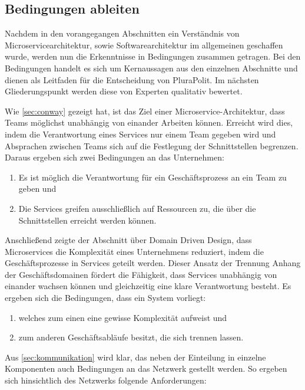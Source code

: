 \subsection{Bedingungen ableiten}
\label{sec:bedingungen}

Nachdem in den vorangegangen Abschnitten ein Verständnis von Microservicearchitektur, sowie Softwarearchitektur im allgemeinen geschaffen wurde, werden nun die Erkenntnisse in Bedingungen zusammen getragen. Bei den Bedingungen handelt es sich um Kernaussagen aus den einzelnen Abschnitte und dienen als Leitfaden für die Entscheidung von PluraPolit. Im nächsten Gliederungspunkt werden diese von Experten qualitativ bewertet.

Wie \cref{sec:conway} gezeigt hat, ist das Ziel einer Microservice-Architektur,  dass Teams möglichst unabhängig von einander Arbeiten können. Erreicht wird dies, indem die Verantwortung eines Services nur einem Team gegeben wird und Absprachen zwischen Teams sich auf die Festlegung der Schnittstellen begrenzen. Daraus ergeben sich zwei Bedingungen an das Unternehmen:

\begin{enumerate}
	\item Es ist möglich die Verantwortung für ein Geschäftsprozess an ein Team zu geben und
	\item Die Services greifen ausschließlich auf Ressourcen zu, die über die Schnittstellen erreicht werden können.
\end{enumerate}

Anschließend zeigte der Abschnitt über Domain Driven Design, dass Microservices die Komplexität eines Unternehmens reduziert, indem die Geschäftsprozesse in Services geteilt werden. Dieser Ansatz der Trennung Anhang der Geschäftsdomainen fördert die Fähigkeit, dass Services unabhängig von einander wachsen können und gleichzeitig eine klare Verantwortung besteht. Es ergeben sich die Bedingungen, dass ein System vorliegt:

\begin{enumerate}
	\item welches zum einen eine gewisse Komplexität aufweist und
	\item zum anderen Geschäftsabläufe besitzt, die sich trennen lassen.
\end{enumerate}

Aus \cref{sec:kommunikation} wird klar, das neben der Einteilung in einzelne Komponenten auch Bedingungen an das Netzwerk gestellt werden. So ergeben sich hinsichtlich des Netzwerks folgende Anforderungen:

